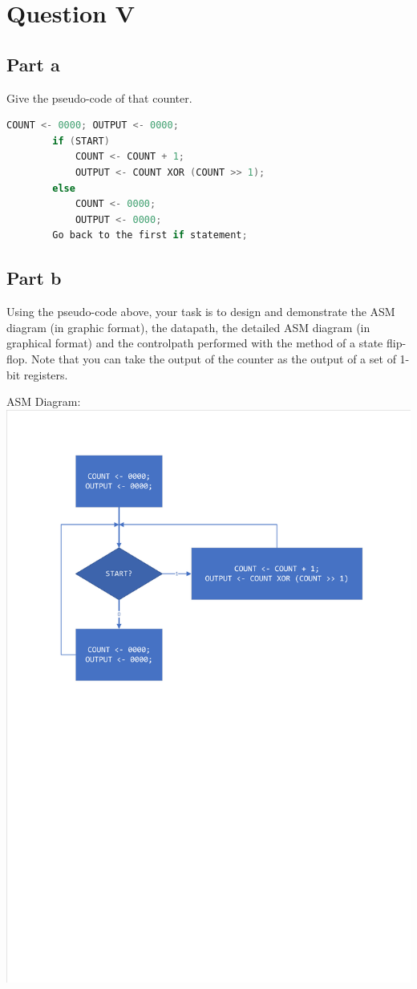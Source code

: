 \documentclass[12pt, a4paper]{article}
\begin{document}
	\section*{Question V}
	\subsection*{Part a}
	Give the pseudo-code of that counter.

	\begin{lstlisting}[language=c]
		COUNT <- 0000; OUTPUT <- 0000;
		if (START)
			COUNT <- COUNT + 1;
			OUTPUT <- COUNT XOR (COUNT >> 1);
		else
			COUNT <- 0000;
			OUTPUT <- 0000;
		Go back to the first if statement;
	\end{lstlisting}

	\subsection*{Part b}
	Using the pseudo-code above, your task is to design and demonstrate the ASM diagram (in graphic format), the datapath, the detailed ASM diagram (in graphical format) and the controlpath performed with the method of a state flip-flop. Note that you can take the output of the counter as the output of a set of 1-bit registers.
	
	ASM Diagram:\\
	\includegraphics[scale=0.8]{5bASM.pdf}
\end{document}
